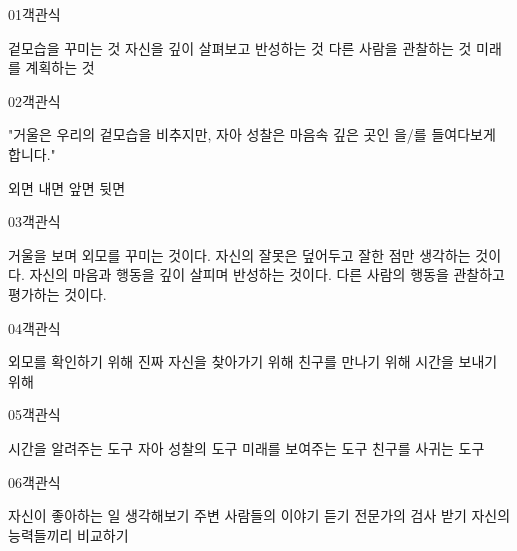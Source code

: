 \documentclass[fs12,seriesSau]{korfarm-base}
\begin{document}
\begin{kfQBlock}{01}{객관식}
\begin{kfChoices}
\kfChoice 겉모습을 꾸미는 것
\kfChoice 자신을 깊이 살펴보고 반성하는 것
\kfChoice 다른 사람을 관찰하는 것
\kfChoice 미래를 계획하는 것
\end{kfChoices}
\end{kfQBlock}

\begin{kfQBlock}{02}{객관식}
\begin{kfEvidence}"거울은 우리의 겉모습을 비추지만, 자아 성찰은 마음속 깊은 곳인 \kfFillBlank[30mm]{}을/를 들여다보게 합니다."\end{kfEvidence}
\begin{kfChoices}
\kfChoice 외면
\kfChoice 내면
\kfChoice 앞면
\kfChoice 뒷면
\end{kfChoices}
\end{kfQBlock}

\begin{kfQBlock}{03}{객관식}
\begin{kfChoices}
\kfChoice 거울을 보며 외모를 꾸미는 것이다.
\kfChoice 자신의 잘못은 덮어두고 잘한 점만 생각하는 것이다.
\kfChoice 자신의 마음과 행동을 깊이 살피며 반성하는 것이다.
\kfChoice 다른 사람의 행동을 관찰하고 평가하는 것이다.
\end{kfChoices}
\end{kfQBlock}

\begin{kfQBlock}{04}{객관식}
\begin{kfChoices}
\kfChoice 외모를 확인하기 위해
\kfChoice 진짜 자신을 찾아가기 위해
\kfChoice 친구를 만나기 위해
\kfChoice 시간을 보내기 위해
\end{kfChoices}
\end{kfQBlock}

\begin{kfQBlock}{05}{객관식}
\begin{kfChoices}
\kfChoice 시간을 알려주는 도구
\kfChoice 자아 성찰의 도구
\kfChoice 미래를 보여주는 도구
\kfChoice 친구를 사귀는 도구
\end{kfChoices}
\end{kfQBlock}

\begin{kfQBlock}{06}{객관식}
\begin{kfChoices}
\kfChoice 자신이 좋아하는 일 생각해보기
\kfChoice 주변 사람들의 이야기 듣기
\kfChoice 전문가의 검사 받기
\kfChoice 자신의 능력들끼리 비교하기
\end{kfChoices}
\end{kfQBlock}
\end{document}
